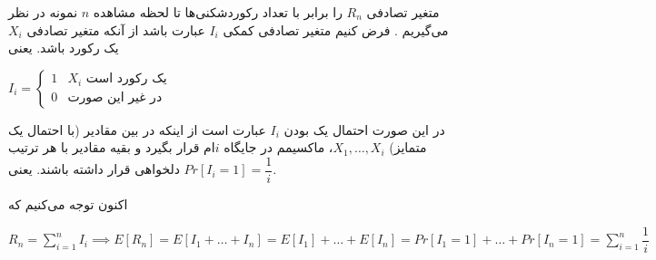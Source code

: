 \documentclass{scribe-cgenomics}
\begin{document}
\newpage
\begin{prob}
\end{prob}

\begin{حل}
متغیر تصادفی
$R_n$
را برابر با تعداد رکوردشکنی‌ها تا لحظه مشاهده
$n$
نمونه در نظر می‌گیریم
\cite{andel}.
فرض کنیم متغیر تصادفی کمکی
$I_i$
عبارت باشد از آنکه متغیر تصادفی
$X_i$
یک رکورد باشد. یعنی

\begin{center}
$
I_i = \begin{cases}
1 & \text{$X_i$ یک رکورد است}\\
0 & \text{در غیر این صورت}
\end{cases}
$
\end{center}

در این صورت احتمال یک بودن
$I_i$
عبارت است از
اینکه در بین مقادیر (با احتمال یک متمایز)
$X_1, \dots, X_i$،
ماکسیمم در جایگاه
$i$ام
قرار بگیرد و بقیه مقادیر با هر ترتیب دلخواهی قرار داشته باشند. یعنی
$Pr[I_i=1] = \dfrac{1}{i}$.

اکنون توجه می‌کنیم که

\begin{center}
$
R_n = \sum_{i=1}^{n} I_i
\implies
E[R_n] = E[I_1 + \dots + I_n] 
= E[I_1] + \dots + E[I_n]
= Pr[I_1=1] + \dots + Pr[I_n=1]
= \sum_{i=1}^{n} \dfrac{1}{i}
$
\end{center}

\vspace*{1in}



\end{حل}


\newpage
\begin{prob}
\end{prob}
\end{document}
